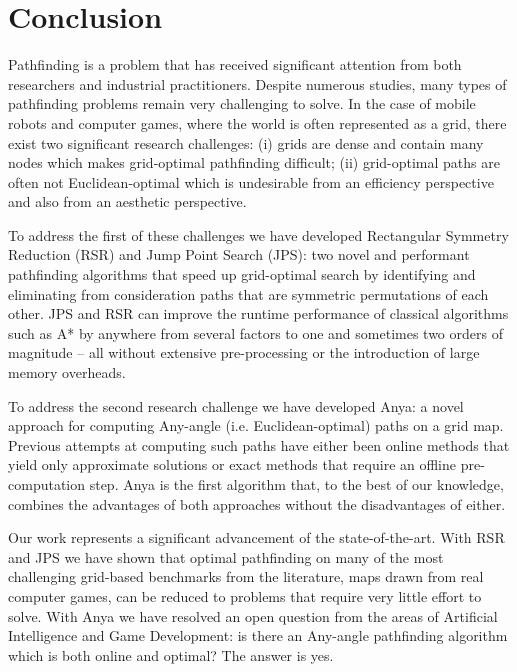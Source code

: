 \chapter{Conclusion}
\label{cha::conclusion}

Pathfinding is a problem that has received significant attention from both
researchers and industrial practitioners. Despite numerous studies, many types
of pathfinding problems remain very challenging to solve. In the case of
mobile robots and computer games, where the world is often represented as a
grid, there exist two significant research challenges: (i) grids are dense and
contain many nodes which makes grid-optimal pathfinding difficult; (ii)
grid-optimal paths are often not Euclidean-optimal which is undesirable from
an efficiency perspective and also from an aesthetic perspective.

To address the first of these challenges we have developed Rectangular
Symmetry Reduction (RSR) and Jump Point Search (JPS): two novel and performant
pathfinding algorithms that speed up grid-optimal search by identifying and
eliminating from consideration paths that are symmetric permutations of each
other.  JPS and RSR can improve the runtime performance of classical
algorithms such as A{*} by anywhere from several factors to one and sometimes
two orders of magnitude -- all without extensive pre-processing or the
introduction of large memory overheads.

To address the second research challenge we have developed Anya: a novel
approach for computing Any-angle (i.e. Euclidean-optimal) paths on a grid map.
Previous attempts at computing such paths have either been online methods that
yield only approximate solutions or exact methods that require an offline
pre-computation step.  Anya is the first algorithm that, to the best of our
knowledge, combines the advantages of both approaches without the
disadvantages of either.

Our work represents a significant advancement of the state-of-the-art. With
RSR and JPS we have shown that optimal pathfinding on many of the most
challenging grid-based benchmarks from the literature, maps drawn from real
computer games, can be reduced to problems that require very little effort to 
solve. With Anya we have resolved an open question from the areas of Artificial 
Intelligence and Game Development: is there an Any-angle pathfinding algorithm
which is both online and optimal?  The answer is yes.

\newpage
